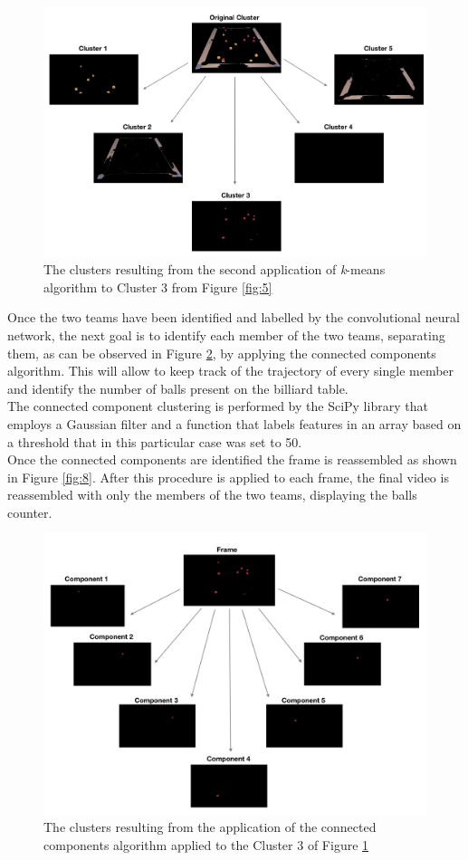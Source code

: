 \documentclass{usiinftr}
\begin{document}
\begin{figure}[h]
	\centering
	\includegraphics[width=0.8\linewidth]{./img/clusters2}
	\caption{The clusters resulting from the second application of \textit{k}-means algorithm to Cluster 3 from Figure \ref{fig:5}}
	\label{fig:6}
\end{figure}

Once the two teams have been identified and labelled by the convolutional neural network, the next goal is to identify each member of the two teams, separating them, as can be observed in Figure \ref{fig:7}, by applying the connected components algorithm. This will allow to keep track of the trajectory of every single member and identify the number of balls present on the billiard table. \\


The connected component clustering is performed by the SciPy library that employs a Gaussian filter and a function that labels features in an array based on a threshold that in this particular case was set to 50. \\


Once the connected components are identified the frame is reassembled as shown in Figure \ref{fig:8}. 
After this procedure is applied to each frame, the final video is reassembled with only the members of the two teams, displaying the balls counter. 
\begin{figure}[h]
	\centering
	\includegraphics[width=0.8\linewidth]{./img/cc}
	\caption{The clusters resulting from the application of the connected components algorithm applied to the Cluster 3 of Figure \ref{fig:6}}
	\label{fig:7}
\end{figure}
\end{document}
